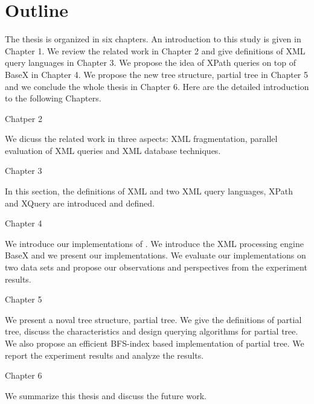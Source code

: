 \section{Outline}

The thesis is organized in six chapters. An introduction to this study is given
in Chapter 1. We  review the  related work in Chapter 2 and give definitions of
XML query languages in Chapter 3. We propose the idea of XPath queries on top of
BaseX in Chapter 4. We propose the new tree structure, partial tree in Chapter 5
and  we conclude the whole thesis in Chapter 6. Here are the detailed
introduction to the following Chapters.

Chatper 2

We dicuss the related work in three aspects: XML fragmentation, parallel
evaluation of XML queries and XML database techniques.

Chapter 3

In this section, the definitions of XML and two XML query languages, XPath and
XQuery are introduced and defined.

Chapter 4

We introduce our implementations of \cite{BoLS09}.  We introduce the XML
processing engine BaseX and we present our implementations. We evaluate our
implementations on two data sets and propose our observations and perspectives
from the experiment results.

Chapter 5

We present a noval tree structure, partial tree. We give the definitions of
partial tree, discuss the characteristics and design querying algorithms for
partial tree. We also propose an efficient BFS-index based implementation of
partial tree. We report the experiment results and analyze the results.

Chapter 6

We summarize this thesis and discuss the future work.

